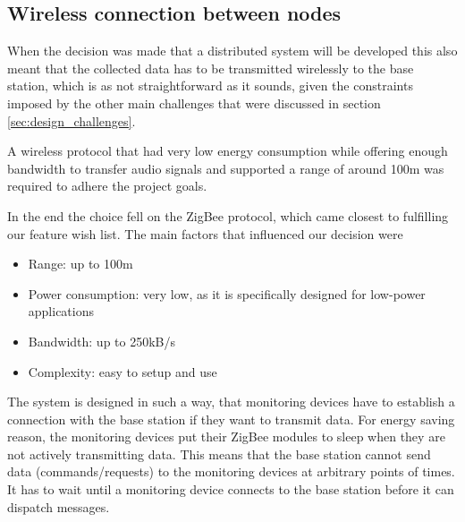 \subsection{Wireless connection between nodes}
\label{sec:wireless_connection}
When the decision was made that a distributed system will be developed this also meant that the collected data has to be transmitted wirelessly to the base station, which is as not straightforward as it sounds, given the constraints imposed by the other main challenges that were discussed in section \ref{sec:design_challenges}.

A wireless protocol that had very low energy consumption while offering enough bandwidth to transfer audio signals and supported a range of around 100m was required to adhere the project goals.

In the end the choice fell on the ZigBee protocol, which came closest to fulfilling our feature wish list. The main factors that influenced our decision were
\begin{itemize}
\item Range: up to 100m
\item Power consumption: very low, as it is specifically designed for low-power applications
\item Bandwidth: up to 250kB/s
\item Complexity: easy to setup and use
\end{itemize}

The system is designed in such a way, that monitoring devices have to establish a connection with the base station if they want to transmit data. For energy saving reason, the monitoring devices put their ZigBee modules to sleep when they are not actively transmitting data. This means that the base station cannot send data (commands/requests) to the monitoring devices at arbitrary points of times. It has to wait until a monitoring device connects to the base station before it can dispatch messages. 


